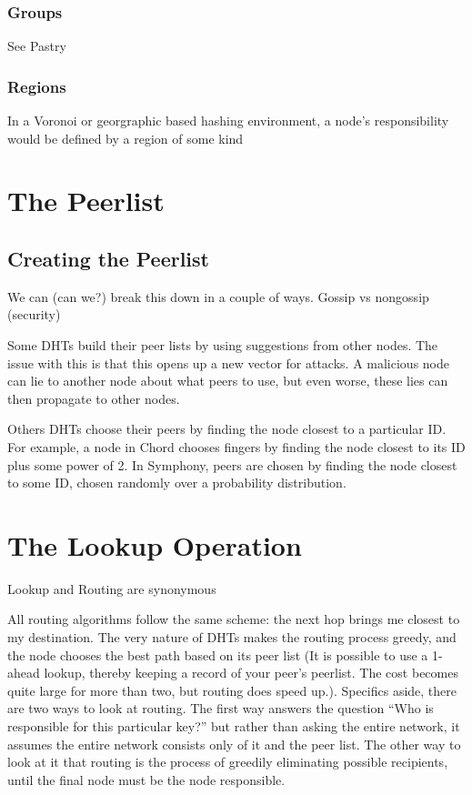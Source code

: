 \documentclass[10pt,letterpaper]{report}
\begin{document}
\subsubsection{Groups}

See Pastry

\subsubsection{Regions}
In a Voronoi or georgraphic based hashing environment, a node's responsibility would be defined by a region of some kind





\section{The Peerlist}


\subsection{Creating the Peerlist}
We can (can we?) break this down in a couple of ways.  Gossip vs nongossip (security)


Some DHTs build their peer lists by using suggestions from other nodes.  The issue with this is that this opens up a new vector for attacks.   A malicious node can lie to another node about what peers to use, but even worse, these lies can then propagate to other nodes.

Others DHTs choose their peers by finding the node closest to a particular ID.  For example, a node in Chord chooses fingers by finding the node closest to its ID plus some  power of 2.    In Symphony, peers are chosen by finding the node closest to some ID, chosen randomly over a probability distribution.



\section{The Lookup Operation} 

Lookup and Routing are synonymous

All routing algorithms follow the same scheme:  the next hop  brings me closest to my destination.  The very nature of DHTs makes the routing process greedy, and the node chooses the best path based on its peer list (It is possible to use a 1-ahead lookup, thereby keeping a record of your peer's peerlist.  The cost becomes quite large for more than two, but routing does speed up.).  Specifics aside, there are two ways to look at routing.  The first way  answers the question ``Who is responsible for this particular key?''  but rather than asking the entire network, it assumes the entire network consists only of it and the peer list.  The other way to look at it that routing is the process of greedily  eliminating possible recipients, until the final node must be the node responsible.  
\end{document}
